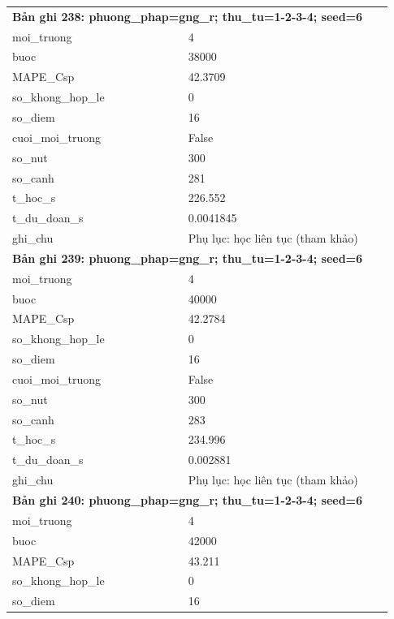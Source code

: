 \begin{longtable}{p{0.43\linewidth}p{0.50\linewidth}}
\midrule
\multicolumn{2}{p{0.95\linewidth}}{\textbf{Bản ghi 238: phuong\_phap=gng\_r; thu\_tu=1-2-3-4; seed=6}} \\
moi\_\allowbreak truong & 4 \\
buoc & 38000 \\
MAPE\_\allowbreak Csp & 42.3709 \\
so\_\allowbreak khong\_\allowbreak hop\_\allowbreak le & 0 \\
so\_\allowbreak diem & 16 \\
cuoi\_\allowbreak moi\_\allowbreak truong & False \\
so\_\allowbreak nut & 300 \\
so\_\allowbreak canh & 281 \\
t\_\allowbreak hoc\_\allowbreak s & 226.552 \\
t\_\allowbreak du\_\allowbreak doan\_\allowbreak s & 0.0041845 \\
ghi\_\allowbreak chu & Phụ lục: học liên tục (tham khảo) \\
\midrule
\multicolumn{2}{p{0.95\linewidth}}{\textbf{Bản ghi 239: phuong\_phap=gng\_r; thu\_tu=1-2-3-4; seed=6}} \\
moi\_\allowbreak truong & 4 \\
buoc & 40000 \\
MAPE\_\allowbreak Csp & 42.2784 \\
so\_\allowbreak khong\_\allowbreak hop\_\allowbreak le & 0 \\
so\_\allowbreak diem & 16 \\
cuoi\_\allowbreak moi\_\allowbreak truong & False \\
so\_\allowbreak nut & 300 \\
so\_\allowbreak canh & 283 \\
t\_\allowbreak hoc\_\allowbreak s & 234.996 \\
t\_\allowbreak du\_\allowbreak doan\_\allowbreak s & 0.002881 \\
ghi\_\allowbreak chu & Phụ lục: học liên tục (tham khảo) \\
\midrule
\multicolumn{2}{p{0.95\linewidth}}{\textbf{Bản ghi 240: phuong\_phap=gng\_r; thu\_tu=1-2-3-4; seed=6}} \\
moi\_\allowbreak truong & 4 \\
buoc & 42000 \\
MAPE\_\allowbreak Csp & 43.211 \\
so\_\allowbreak khong\_\allowbreak hop\_\allowbreak le & 0 \\
so\_\allowbreak diem & 16 \\

\end{longtable}
